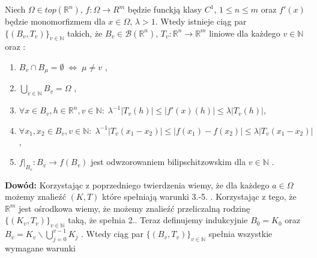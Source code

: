 \begin{lem}
	Niech $\Omega \in top(\mathbb{R}^n)$, $f: \Omega \rightarrow \mathbb{}R^m$  będzie funckją klasy $C^1$, $1 \leq n \leq m$ oraz $f'(x)$ będzie monomorfizmem dla $x \in \Omega$, $\lambda > 1$. Wtedy istnieje ciąg par $\{(B_v, T_v)\}_{v \in \mathbb{N}}$ takich, że $B_v \in \mathcal{B}(\mathbb{R}^n)$, $T_v: \mathbb{R}^n \rightarrow \mathbb{R}^m$ liniowe dla każdego $v \in \mathbb{N}$ oraz :
	\begin{enumerate}
		\item $B_v \cap B_{\mu} = \emptyset \; \Leftrightarrow \; \mu \neq v$ ,
		\item $\bigcup_{v \in \mathbb{N}} B_v = \Omega$ ,
		\item $\forall x \in B_v, h \in \mathbb{R}^n, v \in \mathbb{N}: \; \lambda^{-1}|T_v(h)| \leq |f'(x)(h)| \leq \lambda|T_v(h)|$,
		\item $\forall x_1, x_2 \in B_v, v \in \mathbb{N}: \; \lambda^{-1}|T_v(x_1 - x_2)| \leq |f(x_1) - f(x_2)| \leq \lambda|T_v(x_1 - x_2)|$,
		\item $f|_{B_v}: B_v \rightarrow f(B_v)$ jest odwzorowaniem bilipschitzowskim dla $v \in \mathbb{N}$ .
	\end{enumerate}

	\textbf{Dowód:}\newline
	Korzystając z poprzedniego twierdzenia wiemy, że dla każdego $a \in \Omega$ możemy znalieźć $(K, T)$ które spełniają warunki 3.-5. . Korzystając z tego, że $\mathbb{R}^m$ jest ośrodkowa wiemy, że możemy znalieźć przeliczalną rodzinę $\{(K_v, T_v)\}_{v \in \mathbb{N}}$ taką, że spełnia 2.. Teraz definujemy indukcyjnie $B_0 = K_0$ oraz $B_v = K_{v} \backslash \bigcup_{j=0}^{v-1} K_j$ . Wtedy ciąg par $\{(B_v, T_v)\}_{v \in \mathbb{N}}$ spełnia wszystkie wymagane warunki
\end{lem}